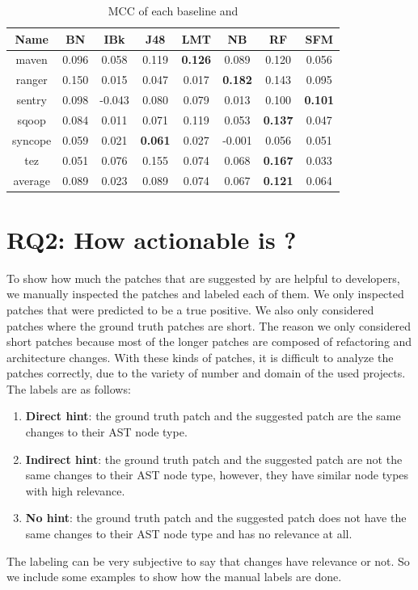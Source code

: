 \begin{table}[!ht]
\caption{MCC of each baseline and \simfinmo}
\centering
\begin{tabular}{|c|c|c|c|c|c|c|c|}
\hline
Name& BN & IBk & J48 & LMT & NB & RF & SFM \\ \hline
maven & 0.096 & 0.058 & 0.119 & \textbf{0.126} & 0.089 & 0.120 & 0.056 \\ \hline
ranger & 0.150 & 0.015 & 0.047 & 0.017 & \textbf{0.182} & 0.143 & 0.095 \\ \hline
sentry & 0.098 & -0.043 & 0.080 & 0.079 & 0.013 & 0.100 & \textbf{0.101} \\ \hline
sqoop & 0.084 & 0.011 & 0.071 & 0.119 & 0.053 & \textbf{0.137} & 0.047 \\ \hline
syncope & 0.059 & 0.021 & \textbf{0.061} & 0.027 & -0.001 & 0.056 & 0.051 \\ \hline
tez & 0.051 & 0.076 & 0.155 & 0.074 & 0.068 & \textbf{0.167} & 0.033 \\ \hline
average & 0.089 & 0.023 & 0.089 & 0.074 & 0.067 & \textbf{0.121} & 0.064 \\ \hline
\end{tabular}%
\label{tab:mcc}
\end{table}


\section{RQ2: How actionable is {\simfinmo}?}
To show how much the patches that are suggested by {\simfinmo} are helpful to developers, we manually inspected the patches and labeled each of them.
We only inspected patches that were predicted to be a true positive.
We also only considered patches where the ground truth patches are short. 
The reason we only considered short patches because most of the longer patches are composed of refactoring and architecture changes.
With these kinds of patches, it is difficult to analyze the patches correctly, due to the variety of number and domain of the used projects.
The labels are as follows:
\begin{enumerate}
    \item \textbf{Direct hint}: the ground truth patch and the suggested patch are the same changes to their AST node type.
    \item \textbf{Indirect hint}: the ground truth patch and the suggested patch are not the same changes to their AST node type, however, they have similar node types with high relevance.
    \item \textbf{No hint}: the ground truth patch and the suggested patch does not have the same changes to their AST node type and has no relevance at all.
\end{enumerate}
The labeling can be very subjective to say that changes have relevance or not.
So we include some examples to show how the manual labels are done.

